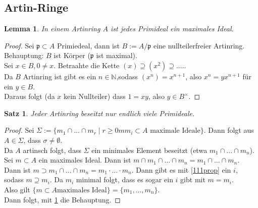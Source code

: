 \documentclass[10pt,a4paper]{article}
\newcommand{\N}{\ensuremath{\mathbb{N}}}
\newcounter{thm}[section]
\theoremstyle{definition}
\theoremstyle{plain}
\newtheorem{lem}[thm]{Lemma}
\newtheorem{satz}[thm]{Satz}
\theoremstyle{remark}
\begin{document}
\subsection{Artin-Ringe}\label{5DArtin}
\begin{lem}\label{523lem}
	In einem Artinring $A$ ist jedes Primideal ein maximales Ideal.
\end{lem}
\begin{proof}
	Sei $\mathfrak p\subset A$ Primiedeal, dann ist $B:=A/\mathfrak p$ eine nullteilerfreier Artinring.\\
	Behauptung: $B$ ist Körper ($\mathfrak p$ ist maximal).\\
	Sei $x\in B,0\neq x$. Betraahte die Kette $(x)\supseteq(x^2)\supseteq....$.\\
	Da $B$ Artinring ist gibt es ein $n\in\N$,sodass $(x^n)=x^{n+1}$, also $x^n=yx^{n+1}$ für ein $y\in B$.\\
	Daraus folgt (da $x$ kein Nullteiler) dass $1=xy$, also $y\in B^\times$.
\end{proof}
\begin{satz}\label{524Satz}
	Jeder Artinring beseitzt nur endlich viele Primideale.
\end{satz}
\begin{proof}
	Sei $\Sigma:=\{m_1\cap...\cap m_r\mid r\ge 0mm_i\subset A\text{ maximale Ideale}\}$. Dann folgt aus $A\in\Sigma$, dass $\sigma\neq \emptyset$.\\
	Da $A$ artinsch folgt, dass $\Sigma$ ein minimales Element beseitzt (etwa $m_1\cap...\cap m_n$).\\
	Sei $m\subset A$ ein maximales Ideal. Dann ist $m\cap m_1\cap...\cap m_n=m_1\cap...\cap m_n$.\\
	Dann ist $m\supset m_1\cap...\cap m_n=m_1\cdot ...\cdot m_n$. Dann gibt es mit \ref{111prop} ein $i$, sodass $m\supseteq m_i$. Da $m_i$ minimal folgt, dass es sogar ein $i$ gibt mit $m=m_i$.\\
	Also gilt $\{m\subset A\text{maximales Ideal}\}=\{m_1,...,m_n\}$.\\
	Dann folgt, mit \ref{523lem} die Behauptung.
\end{proof}
\end{document}
